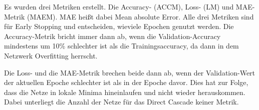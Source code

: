 Es wurden drei Metriken erstellt. 
Die Accuracy- (ACCM), Loss- (LM) und MAE-Metrik (MAEM). MAE heißt dabei Mean absolute Error. 
Alle drei Metriken sind für Early Stopping und entscheiden, wieviele Epochen genutzt werden. 
Die Accuracy-Metrik bricht immer dann ab, wenn die Validation-Accuracy mindestens um 10\% 
schlechter ist als die Trainingsaccuracy, da dann in dem Netzwerk Overfitting herrscht.

Die Loss- und die MAE-Metrik brechen beide dann ab, wenn der Validation-Wert der aktuellen 
Epoche schlechter ist als in der Epoche davor. Dies hat zur Folge, dass die Netze in lokale 
Minima hineinlaufen und nicht wieder herauskommen. Dabei unterliegt die Anzahl der Netze für 
das Direct Cascade keiner Metrik.

